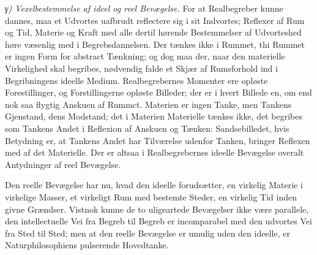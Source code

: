 \documentclass[12pt,a4paper]{book}
\newcommand{\subrunin}[1]{\emph{#1}\hspace{0.4em}}
\begin{document}
\subrunin{γ) Vexelbestemmelse af ideel og reel Bevægelse.} For at
Realbegreber kunne dannes, maa et Udvortes uafbrudt reflectere sig i
sit Indvortes; Reflexer af Rum og Tid, Materie og Kraft med alle dertil
hørende Bestemmelser af Udvorteshed høre væsenlig med i
Begrebsdannelsen. Der tænkes ikke i Rummet, thi Rummet er ingen Form
for abstract Tænkning; og dog maa der, naar den materielle Virkelighed
skal begribes, nødvendig falde et Skjær af Rumsforhold ind i
Begribningens ideelle Medium. Realbegrebernes Momenter ere opløste
Forestillinger, og Forstillingerne opløste Billeder; der er i hvert
Billede en, om end nok saa
flygtig Anskuen af Rummct. Materien er ingen Tanke, men Tankens
Gjenstand, dens Modstand; det i Materien Materielle tænkes ikke, det
begribes som Tankens Andet i Reflexion af Anskuen og Tænken:
Sandsebilledet, hvis Betydning er, at Tankens Andet har Tilværelse
udenfor Tanken, bringer Reflexen med af det Materielle. Der er altsaa i
Realbegrebernes ideelle Bevægelse overalt Antydninger af reel
Bevægelse.

Den reelle Bevægelse har nu, hvad den ideelle forudsætter, en virkelig
Materie i virkelige Masser, et virkeligt Rum med bestemte Steder, en
virkelig Tid inden givne Grændser. Vistnok kunne de to uligeartede
Bevægelser ikke være parallele, den intellectuelle Vei fra Begreb til
Begreb er incomparabel med den udvortes Vei fra Sted til Sted; men at
den reelle Bevægelse er umulig uden den ideelle, er Naturphilosophiens
pulserende Hovedtanke.
\end{document}
